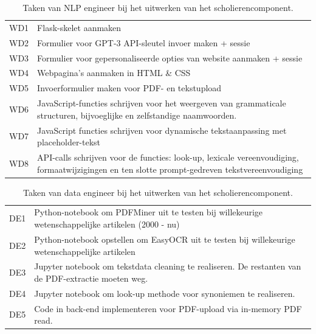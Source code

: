 \begin{center}
	\begin{table}
		\begin{tabular}{ | m{2cm} | m{12cm} | } 
			\hline
			WD1 & Flask-skelet aanmaken \\
			WD2 & Formulier voor GPT-3 API-sleutel invoer maken + sessie \\
			WD3 & Formulier voor gepersonaliseerde opties van website aanmaken + sessie \\
			WD4 & Webpagina's aanmaken in HTML \& CSS \\
			WD5 & Invoerformulier maken voor PDF- en tekstupload \\
			WD6 & JavaScript-functies schrijven voor het weergeven van grammaticale structuren, bijvoeglijke en zelfstandige naamwoorden. \\
			WD7 & JavaScript functies schrijven voor dynamische tekstaanpassing met placeholder-tekst \\
			WD8 & API-calls schrijven voor de functies: look-up, lexicale vereenvoudiging, formaatwijzigingen en ten slotte prompt-gedreven tekstvereenvoudiging \\
			\hline
		\end{tabular}
		\caption{Taken van NLP engineer bij het uitwerken van het scholierencomponent.}
		\label{table:tasks-nlp-engineer-scholars}
	\end{table}
\end{center}

\begin{center}
	\begin{table}[H]
		\begin{tabular}{|m{2cm}|m{12cm}|}
			\hline
			DE1	& Python-notebook om PDFMiner uit te testen bij willekeurige wetenschappelijke artikelen (2000 - nu) \\
			DE2 & Python-notebook opstellen om EasyOCR uit te testen bij willekeurige wetenschappelijke artikelen \\
			DE3 & Jupyter notebook om tekstdata cleaning te realiseren. De restanten van de PDF-extractie moeten weg. \\
			DE4 & Jupyter notebook om look-up methode voor synoniemen te realiseren. \\
			DE5 & Code in back-end implementeren voor PDF-upload via in-memory PDF read. \\
			\hline
		\end{tabular}
		\caption{Taken van data engineer bij het uitwerken van het scholierencomponent.}
		\label{table:tasks-data-engineer-scholars}
	\end{table}
\end{center}

